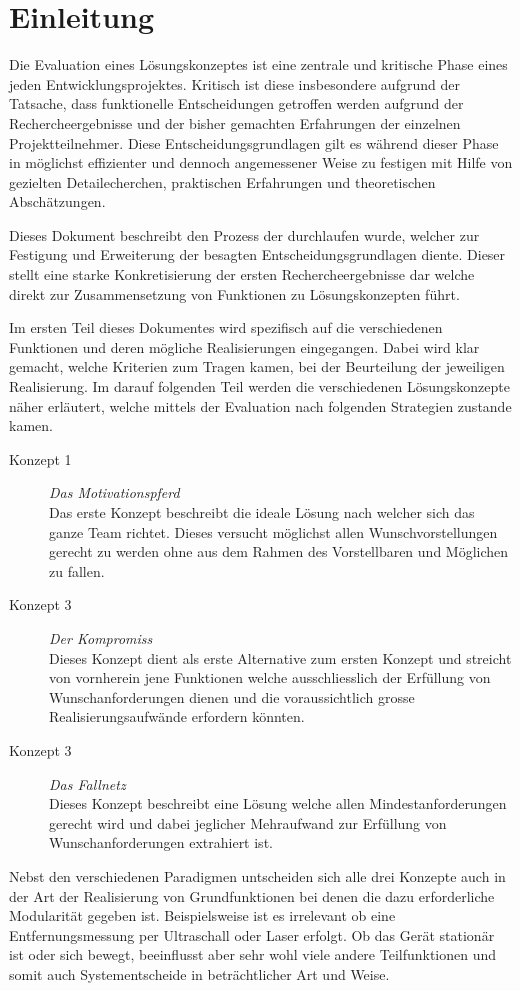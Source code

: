 \section{Einleitung}

Die Evaluation eines Lösungskonzeptes ist eine zentrale und kritische Phase
eines jeden Entwicklungsprojektes. Kritisch ist diese insbesondere aufgrund 
der Tatsache, dass funktionelle Entscheidungen getroffen werden aufgrund der
Rechercheergebnisse und der bisher gemachten Erfahrungen der einzelnen 
Projektteilnehmer. Diese Entscheidungsgrundlagen gilt es während dieser Phase
in möglichst effizienter und dennoch angemessener Weise zu festigen mit Hilfe
von gezielten Detailecherchen, praktischen Erfahrungen und theoretischen
Abschätzungen.

Dieses Dokument beschreibt den Prozess der durchlaufen wurde, welcher zur 
Festigung und Erweiterung der besagten Entscheidungsgrundlagen diente. Dieser
stellt eine starke Konkretisierung der ersten Rechercheergebnisse dar welche
direkt zur Zusammensetzung von Funktionen zu Lösungskonzepten führt. 

Im ersten Teil dieses Dokumentes wird spezifisch auf die verschiedenen
Funktionen und deren mögliche Realisierungen eingegangen. Dabei wird klar 
gemacht, welche Kriterien zum Tragen kamen, bei der Beurteilung der jeweiligen
Realisierung. Im darauf folgenden Teil werden die verschiedenen 
Lösungskonzepte näher erläutert, welche mittels der Evaluation nach folgenden
Strategien zustande kamen.

\begin{description}
	\item[Konzept 1] \emph{Das Motivationspferd} \\
		Das erste Konzept beschreibt die ideale Lösung nach welcher
		sich das ganze Team richtet. Dieses versucht möglichst allen
		Wunschvorstellungen gerecht zu werden ohne aus dem Rahmen
		des Vorstellbaren und Möglichen zu fallen.
	\item[Konzept 3] \emph{Der Kompromiss} \\
		Dieses Konzept dient als erste Alternative zum ersten Konzept
		und streicht von vornherein jene Funktionen welche 
		ausschliesslich der Erfüllung von Wunschanforderungen dienen
		und die voraussichtlich grosse Realisierungsaufwände 
		erfordern könnten.
	\item[Konzept 3] \emph{Das Fallnetz} \\
		Dieses Konzept beschreibt eine Lösung welche allen 
		Mindestanforderungen gerecht wird und dabei jeglicher 
		Mehraufwand zur Erfüllung von Wunschanforderungen
		extrahiert ist.
\end{description}

Nebst den verschiedenen Paradigmen untscheiden sich alle drei Konzepte
auch in der Art der Realisierung von Grundfunktionen bei denen die dazu
erforderliche Modularität gegeben ist. Beispielsweise ist es irrelevant
ob eine Entfernungsmessung per Ultraschall oder Laser erfolgt. Ob das
Gerät stationär ist oder sich bewegt, beeinflusst aber sehr wohl viele 
andere Teilfunktionen und somit auch Systementscheide in beträchtlicher 
Art und Weise.
